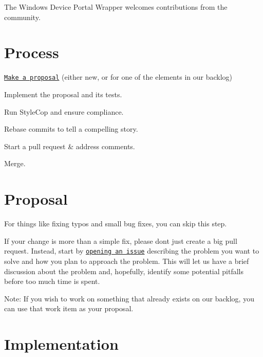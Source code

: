 The Windows Device Portal Wrapper welcomes contributions from the community.

\section*{Process}


\begin{DoxyEnumerate}
\item \href{https://github.com/Microsoft/WindowsDevicePortalWrapper/issues}{\tt Make a proposal} (either new, or for one of the elements in our backlog)
\item Implement the proposal and its tests.
\item Run Style\+Cop and ensure compliance.
\item Rebase commits to tell a compelling story.
\item Start a pull request \& address comments.
\item Merge.
\end{DoxyEnumerate}

\section*{Proposal}

For things like fixing typos and small bug fixes, you can skip this step.

If your change is more than a simple fix, please don\textquotesingle{}t just create a big pull request. Instead, start by \href{https://github.com/Microsoft/WindowsDevicePortalWrapper/issues}{\tt opening an issue} describing the problem you want to solve and how you plan to approach the problem. This will let us have a brief discussion about the problem and, hopefully, identify some potential pitfalls before too much time is spent.

Note\+: If you wish to work on something that already exists on our backlog, you can use that work item as your proposal.

\section*{Implementation}


